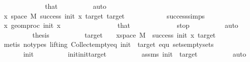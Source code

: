 \begin{isabellebody}
\ \ \ \ \ \ \ \ \ \ \ \ \ that\isanewline
\ \ \ \ \ \ \ \ \isamarkupfalse%
\ auto\isanewline
\ \ \ \ \ \ \isamarkupfalse%
\ \isamarkupfalse%
\ {\isachardoublequoteopen}{\isasymforall}x{\isasymin}\ space\ M{\isachardot}{\kern0pt}\ success\ init\ x\ target{\isachardoublequoteclose}\ {\isachardoublequoteopen}target\ {\isacharequal}{\kern0pt}\ {}{\isachardoublequoteclose}\isanewline
\ \ \ \ \ \ \ \ \isamarkupfalse%
\ success{\isachardot}{\kern0pt}simps\isanewline
\ \ \ \ \ \ \ \ \isamarkupfalse%
\ {\isacartoucheopen}{\isasymAnd}x{\isachardot}{\kern0pt}\ geom{\isacharunderscore}{\kern0pt}proc\ init\ x\ {}\ {\isacharequal}{\kern0pt}\ {}{\isacartoucheclose}\isanewline
\ \ \ \ \ \ \ \ \ \ \ \ \ that\isanewline
\ \ \ \ \ \ \ \ \ \ \ \ \ stop\isanewline
\ \ \ \ \ \ \ \ \isamarkupfalse%
\ auto\isanewline
\ \ \ \ \ \ \isamarkupfalse%
\ \isamarkupfalse%
\ {\isacharquery}{\kern0pt}thesis\isanewline
\ \ \ \ \ \ \ \ \isamarkupfalse%
\ {\isacartoucheopen}target\ {\isasymnoteq}\ {}\ {\isasymLongrightarrow}\ {\isasymforall}x{\isasymin}space\ M{\isachardot}{\kern0pt}\ {\isasymnot}\ success\ init\ x\ target{\isacartoucheclose}\isanewline
\ \ \ \ \ \ \ \ \isamarkupfalse%
\ {\isacharparenleft}{\kern0pt}metis\ {\isacharparenleft}{\kern0pt}no{\isacharunderscore}{\kern0pt}types{\isacharcomma}{\kern0pt}\ lifting{\isacharparenright}{\kern0pt}\ Collect{\isacharunderscore}{\kern0pt}empty{\isacharunderscore}{\kern0pt}eq\ {\isacartoucheopen}init\ {\isasymnoteq}\ target{\isacartoucheclose}\ equ{}\ sets{\isachardot}{\kern0pt}empty{\isacharunderscore}{\kern0pt}sets{\isacharparenright}{\kern0pt}\isanewline
\ \ \ \ \isamarkupfalse%
\isanewline
\ \ \ \ \ \ \isamarkupfalse%
{\isachardoublequoteopen}init{\isasymnoteq}{}{\isachardoublequoteclose}\isanewline
\ \ \ \ \ \ \isamarkupfalse%
\ \isamarkupfalse%
\ {\isachardoublequoteopen}{}{\isacharless}{\kern0pt}init{\isachardoublequoteclose}{\isachardoublequoteopen}init{\isacharless}{\kern0pt}target{\isachardoublequoteclose}\isanewline
\ \ \ \ \ \ \ \ \isamarkupfalse%
\ assms\ {\isacartoucheopen}init\ {\isasymnoteq}\ target{\isacartoucheclose}\isanewline
\ \ \ \ \ \ \ \ \isamarkupfalse%
\ auto\isanewline
\ \ \ \ \ \ \isamarkupfalse%
\ \isamarkupfalse%

\end{isabellebody}
